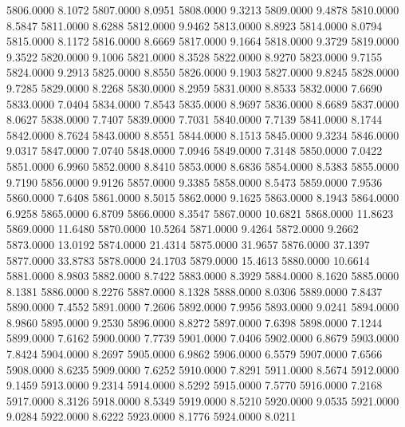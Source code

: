 5806.0000      8.1072
5807.0000      8.0951
5808.0000      9.3213
5809.0000      9.4878
5810.0000      8.5847
5811.0000      8.6288
5812.0000      9.9462
5813.0000      8.8923
5814.0000      8.0794
5815.0000      8.1172
5816.0000      8.6669
5817.0000      9.1664
5818.0000      9.3729
5819.0000      9.3522
5820.0000      9.1006
5821.0000      8.3528
5822.0000      8.9270
5823.0000      9.7155
5824.0000      9.2913
5825.0000      8.8550
5826.0000      9.1903
5827.0000      9.8245
5828.0000      9.7285
5829.0000      8.2268
5830.0000      8.2959
5831.0000      8.8533
5832.0000      7.6690
5833.0000      7.0404
5834.0000      7.8543
5835.0000      8.9697
5836.0000      8.6689
5837.0000      8.0627
5838.0000      7.7407
5839.0000      7.7031
5840.0000      7.7139
5841.0000      8.1744
5842.0000      8.7624
5843.0000      8.8551
5844.0000      8.1513
5845.0000      9.3234
5846.0000      9.0317
5847.0000      7.0740
5848.0000      7.0946
5849.0000      7.3148
5850.0000      7.0422
5851.0000      6.9960
5852.0000      8.8410
5853.0000      8.6836
5854.0000      8.5383
5855.0000      9.7190
5856.0000      9.9126
5857.0000      9.3385
5858.0000      8.5473
5859.0000      7.9536
5860.0000      7.6408
5861.0000      8.5015
5862.0000      9.1625
5863.0000      8.1943
5864.0000      6.9258
5865.0000      6.8709
5866.0000      8.3547
5867.0000     10.6821
5868.0000     11.8623
5869.0000     11.6480
5870.0000     10.5264
5871.0000      9.4264
5872.0000      9.2662
5873.0000     13.0192
5874.0000     21.4314
5875.0000     31.9657
5876.0000     37.1397
5877.0000     33.8783
5878.0000     24.1703
5879.0000     15.4613
5880.0000     10.6614
5881.0000      8.9803
5882.0000      8.7422
5883.0000      8.3929
5884.0000      8.1620
5885.0000      8.1381
5886.0000      8.2276
5887.0000      8.1328
5888.0000      8.0306
5889.0000      7.8437
5890.0000      7.4552
5891.0000      7.2606
5892.0000      7.9956
5893.0000      9.0241
5894.0000      8.9860
5895.0000      9.2530
5896.0000      8.8272
5897.0000      7.6398
5898.0000      7.1244
5899.0000      7.6162
5900.0000      7.7739
5901.0000      7.0406
5902.0000      6.8679
5903.0000      7.8424
5904.0000      8.2697
5905.0000      6.9862
5906.0000      6.5579
5907.0000      7.6566
5908.0000      8.6235
5909.0000      7.6252
5910.0000      7.8291
5911.0000      8.5674
5912.0000      9.1459
5913.0000      9.2314
5914.0000      8.5292
5915.0000      7.5770
5916.0000      7.2168
5917.0000      8.3126
5918.0000      8.5349
5919.0000      8.5210
5920.0000      9.0535
5921.0000      9.0284
5922.0000      8.6222
5923.0000      8.1776
5924.0000      8.0211
